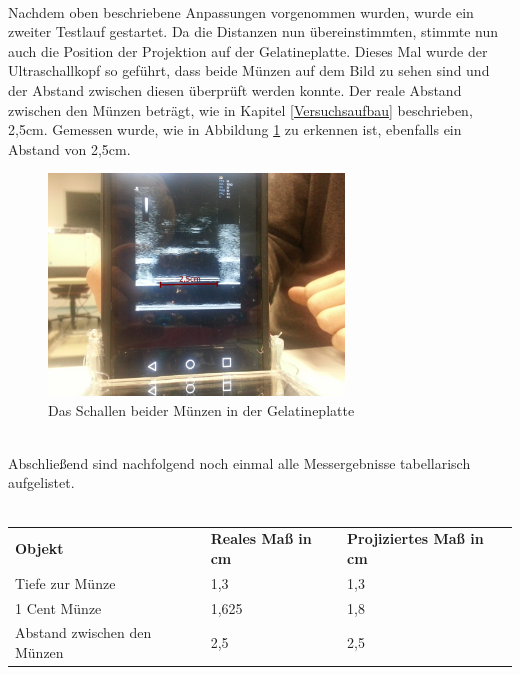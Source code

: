 ~\\
Nachdem oben beschriebene Anpassungen vorgenommen wurden, wurde ein zweiter Testlauf gestartet. Da die Distanzen nun übereinstimmten, stimmte nun auch die Position der Projektion auf der Gelatineplatte. Dieses Mal wurde der Ultraschallkopf so geführt, dass beide Münzen auf dem Bild zu sehen sind und der Abstand zwischen diesen überprüft werden konnte. Der reale Abstand zwischen den Münzen beträgt, wie in Kapitel \ref{Versuchsaufbau} beschrieben, 2,5cm. Gemessen wurde, wie in Abbildung \ref{fig:2Muenzen} zu erkennen ist, ebenfalls ein Abstand von 2,5cm.
\clearpage
\begin{figure}[h]
	\centering
	\includegraphics[width=0.7\textwidth]{Bilder/Evaluation/2Muenzen.jpg}
	\caption{Das Schallen beider Münzen in der Gelatineplatte}
	\label{fig:2Muenzen}
\end{figure}

~\\
Abschließend sind nachfolgend noch einmal alle Messergebnisse tabellarisch aufgelistet.
\\
\\
\begin{tabular}{lll}
\textbf{Objekt} & \textbf{Reales Maß in cm} & \textbf{Projiziertes Maß in cm}\\
Tiefe zur Münze & 1,3 & 1,3\\
1 Cent Münze & 1,625 & 1,8\\
Abstand zwischen den Münzen & 2,5 & 2,5\\
\end{tabular}

